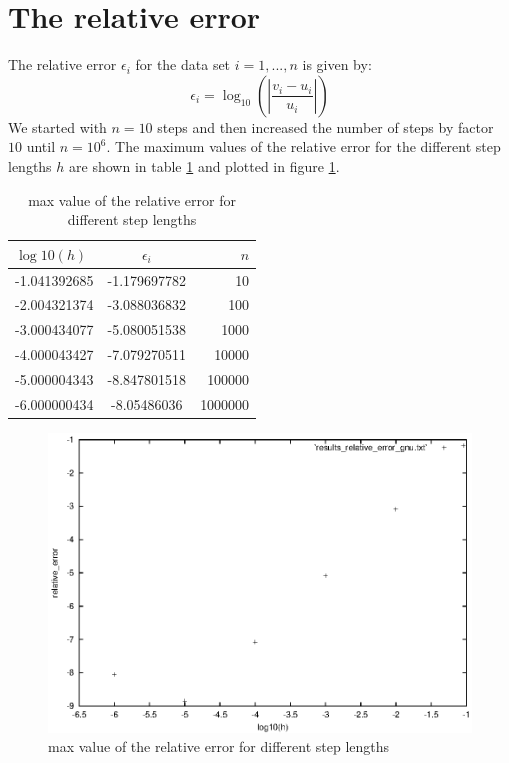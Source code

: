 \documentclass[11pt,a4wide]{article}
\begin{document}
\section{The relative error}
The relative error $\epsilon_{i}$ for the data set $ i= 1,...,n$ is given by:
\begin{equation}
\epsilon_{i} = \log_{10}\left(\left|\dfrac{v_{i}-u_{i}}{u_{i}}\right|\right)
\end{equation}
We started with $n=10$ steps and then increased the number of steps by factor $10$ until $n=10^6$. The maximum values of the relative error for the different step lengths $h$ are shown in table \ref{tab: rel. error} and plotted in figure \ref{graf:relerror}.
\begin{table}[b]
\centering
\caption{max value of the relative error for different step lengths}
\label{tab: rel. error}
\begin{tabular}{lcr}\hline
	$\log10(h)$ & $\epsilon_i$ & $n$ \\
	\hline
	-1.041392685 & -1.179697782 & 10 \\
  -2.004321374 & -3.088036832 & 100 \\
  -3.000434077 & -5.080051538 & 1000 \\
  -4.000043427 & -7.079270511 & 10000 \\
  -5.000004343 & -8.847801518 & 100000 \\
  -6.000000434 & -8.05486036  & 1000000 \\	
\end{tabular}
\end{table}

\begin{figure}
\centering
\label{graf:relerror}
\includegraphics [scale=1] {relerr.eps}
\caption{max value of the relative error for different step lengths}
\end{figure}
\end{document}
